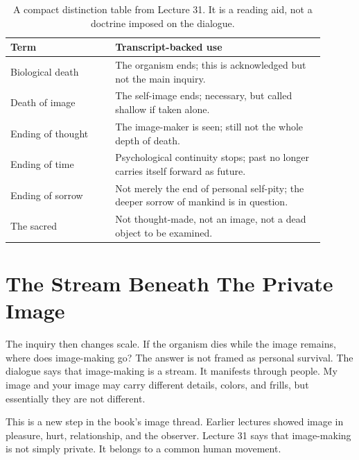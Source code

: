 \documentclass[11pt,oneside]{book}
\begin{document}
\begin{table}
\centering
\begin{tabular}{p{0.30\linewidth}p{0.60\linewidth}}
\hline
\textbf{Term} & \textbf{Transcript-backed use} \\
\hline
Biological death & The organism ends; this is acknowledged but not the main inquiry. \\
Death of image & The self-image ends; necessary, but called shallow if taken alone. \\
Ending of thought & The image-maker is seen; still not the whole depth of death. \\
Ending of time & Psychological continuity stops; past no longer carries itself forward as future. \\
Ending of sorrow & Not merely the end of personal self-pity; the deeper sorrow of mankind is in question. \\
The sacred & Not thought-made, not an image, not a dead object to be examined. \\
\hline
\end{tabular}
\caption{A compact distinction table from Lecture 31. It is a reading aid, not a doctrine imposed on the dialogue.}
\end{table}

\section{The Stream Beneath The Private Image}

The inquiry then changes scale. If the organism dies while the image remains, where does image-making go? The answer is not framed as personal survival. The dialogue says that image-making is a stream. It manifests through people. My image and your image may carry different details, colors, and frills, but essentially they are not different.

This is a new step in the book's image thread. Earlier lectures showed image in pleasure, hurt, relationship, and the observer. Lecture 31 says that image-making is not simply private. It belongs to a common human movement.
\end{document}
